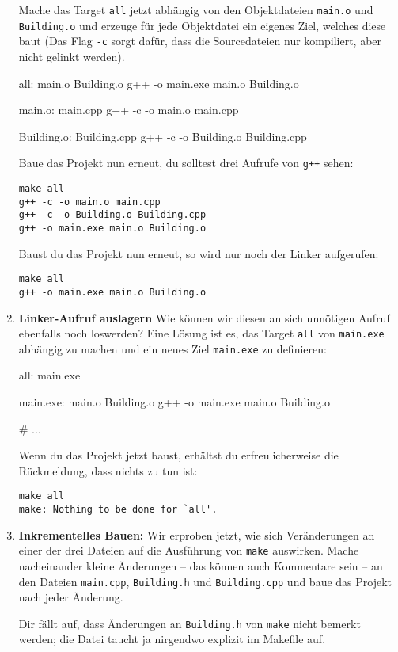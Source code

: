 \begin{enumerate}
Mache das Target \texttt{all} jetzt abhängig von den Objektdateien \texttt{main.o} und \texttt{Building.o} und erzeuge für jede Objektdatei ein eigenes Ziel, welches diese baut (Das Flag \texttt{-c} sorgt dafür, dass die Sourcedateien nur kompiliert, aber nicht gelinkt werden).
\begin{lstmake}
all: main.o Building.o
	g++ -o main.exe main.o Building.o

main.o: main.cpp
	g++ -c -o main.o main.cpp

Building.o: Building.cpp
	g++ -c -o Building.o Building.cpp
\end{lstmake}

Baue das Projekt nun erneut, du solltest drei Aufrufe von \texttt{g++} sehen:
\begin{verbatim}
make all
g++ -c -o main.o main.cpp
g++ -c -o Building.o Building.cpp
g++ -o main.exe main.o Building.o
\end{verbatim}
Baust du das Projekt nun erneut, so wird nur noch der Linker aufgerufen:
\begin{verbatim}
make all
g++ -o main.exe main.o Building.o
\end{verbatim}

\item\textbf{Linker-Aufruf auslagern}
Wie können wir diesen an sich unnötigen Aufruf ebenfalls noch loswerden?
Eine Lösung ist es, das Target \texttt{all} von \texttt{main.exe} abhängig zu machen und ein neues Ziel \texttt{main.exe} zu definieren:
\begin{lstmake}
all: main.exe

main.exe: main.o Building.o
	g++ -o main.exe main.o Building.o

# ...
\end{lstmake}

Wenn du das Projekt jetzt baust, erhältst du erfreulicherweise die Rückmeldung, dass nichts zu tun ist:
\begin{verbatim}
make all
make: Nothing to be done for `all'.
\end{verbatim}

\item\textbf{Inkrementelles Bauen:}
Wir erproben jetzt, wie sich Veränderungen an einer der drei Dateien auf die Ausführung von \texttt{make} auswirken.
Mache nacheinander kleine Änderungen -- das können auch Kommentare sein -- an den Dateien \texttt{main.cpp}, \texttt{Building.h} und \texttt{Building.cpp} und baue das Projekt nach jeder Änderung.

Dir fällt auf, dass Änderungen an \texttt{Building.h} von \texttt{make} nicht bemerkt werden; die Datei taucht ja nirgendwo explizit im Makefile auf.


\end{enumerate}

